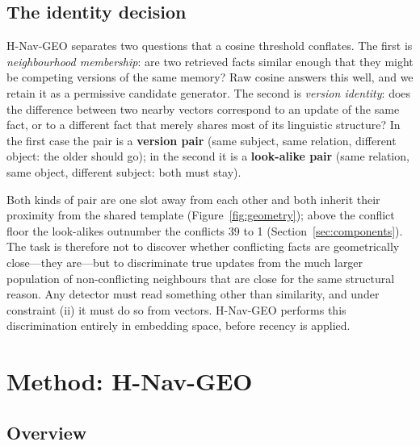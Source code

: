 \documentclass[journal=jcisd8,manuscript=article]{achemso}
\begin{document}
\subsection{The identity decision}
\label{sec:identity}

H-Nav-GEO separates two questions that a cosine threshold conflates. The first is \emph{neighbourhood membership}: are two retrieved facts similar enough that they might be competing versions of the same memory? Raw cosine answers this well, and we retain it as a permissive candidate generator. The second is \emph{version identity}: does the difference between two nearby vectors correspond to an update of the same fact, or to a different fact that merely shares most of its linguistic structure? In the first case the pair is a \textbf{version pair} (same subject, same relation, different object: the older should go); in the second it is a \textbf{look-alike pair} (same relation, same object, different subject: both must stay).

Both kinds of pair are one slot away from each other and both inherit their proximity from the shared template (Figure~\ref{fig:geometry}); above the conflict floor the look-alikes outnumber the conflicts 39 to 1 (Section~\ref{sec:components}). The task is therefore not to discover whether conflicting facts are geometrically close---they are---but to discriminate true updates from the much larger population of non-conflicting neighbours that are close for the same structural reason. Any detector must read something other than similarity, and under constraint (ii) it must do so from vectors. H-Nav-GEO performs this discrimination entirely in embedding space, before recency is applied.

\section{Method: H-Nav-GEO}
\label{sec:method}

\subsection{Overview}
\label{sec:overview}
\end{document}
